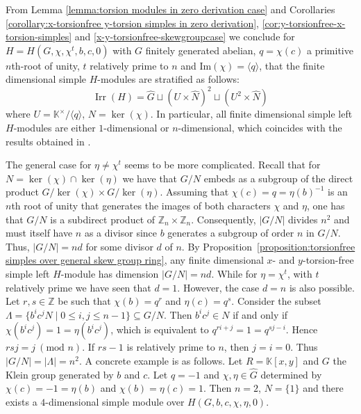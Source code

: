 \documentclass[11pt, twoside]{amsart}
\theoremstyle{definition}
\newcommand{\ZZ}{\mathbb{Z}}
\newcommand{\KK}{\mathbb{K}}
\newcommand{\Irr}{\operatorname{Irr}}
\begin{document}
From Lemma \ref{lemma:torsion modules in zero derivation case} and Corollaries \ref{corollary:x-torsionfree y-torsion simples in zero derivation}, \ref{cor:y-torsionfree-x-torsion-simples} and \ref{x-y-torsionfree-skewgroupcase} we conclude  for $H = H(G, \chi, \chi^t, b, c, 0)$ with $G$ finitely generated abelian, $q = \chi(c)$ a primitive $n$th-root of unity, $t$ relatively prime to $n$ and $\mathrm{Im}(\chi)=\langle q \rangle$, that the finite dimensional simple $H$-modules are stratified as follows:
\begin{equation}
\Irr(H) =  \widehat{G} \sqcup \left( U \times \widehat{N}\right)^2  \sqcup   \left( U^2  \times \widehat{N} \right)
 \end{equation}
 where $U=\KK^\times/\langle q\rangle$, $N=\ker(\chi)$. In particular, all finite dimensional simple left $H$-modules are either $1$-dimensional or $n$-dimensional, which coincides with the results obtained in \cite{Wang-Wu-Tan}.
 
 \medskip
 
 The general case for $\eta\neq \chi^t$ seems to be more complicated. Recall that for $N=\ker(\chi)\cap \ker(\eta)$ we have that $G/N$ embeds as a subgroup of the direct product $G/\ker(\chi) \times G/\ker(\eta)$. Assuming that $\chi(c) = q = \eta(b)^{-1}$ is an $n$th root of unity that generates the images of both characters $\chi$ and $\eta$, one has that $G/N$ is a subdirect product of $\ZZ_n \times \ZZ_n$. Consequently, $|G/N|$ divides $n^2$ and must itself have $n$ as a divisor since $b$ generates a subgroup of order $n$ in $G/N$. Thus, $|G/N| = nd$ for some divisor $d$ of $n$. By Proposition~\ref{proposition:torsionfree simples over general skew group ring}, any finite dimensional  $x$- and $y$-torsion-free simple left $H$-module has dimension $|G/N|=nd$. While for $\eta=\chi^t$, with $t$ relatively prime we have seen that $d=1$. However, the case $d=n$ is also possible. Let $r,s\in\ZZ$ be such that $\chi(b)=q^r$ and $\eta(c)=q^s$. 
 Consider the subset $\Lambda = \{b^i c^j N \mid 0 \leq i, j \leq n-1 \} \subseteq G/N$. Then $b^i c^j \in N$ if and only if 
 $\chi(b^i c^j) = 1 =\eta(b^i c^j)$, which is equivalent to   $q^{ri + j} = 1 = q^{sj - i}$. Hence $rsj = j \ (\text{mod } n)$. If $rs-1$ is relatively prime to $n$, then $j=i=0$. Thus $|G/N|=|\Lambda|=n^2$. A concrete example is as follows. Let $R=\KK[x,y]$ and $G$ the Klein group generated by $b$ and $c$. Let $q=-1$ and $\chi, \eta\in \widehat{G}$ determined by $\chi(c)=-1=\eta(b)$ and $\chi(b)=\eta(c)=1$. Then $n=2$, $N=\{1\}$ and there exists a $4$-dimensional simple module over $H(G,b,c,\chi,\eta,0)$.
\end{document}
